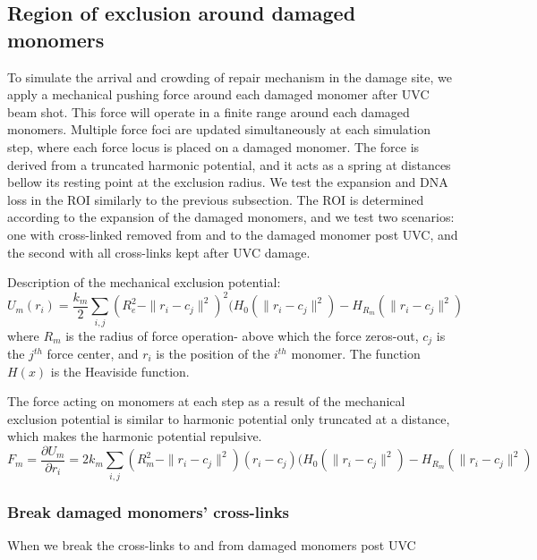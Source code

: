 \documentclass[12pt]{report}
\begin{document}
	 
	 \subsection{Region of exclusion around damaged monomers}
	 To simulate the arrival and crowding of repair mechanism in the damage site, we apply a mechanical pushing force around each damaged monomer after UVC beam shot. This force will operate in a finite range around each damaged monomers. Multiple force foci are updated simultaneously at each simulation step, where each force locus is placed on a damaged monomer. The force is derived from a truncated harmonic potential, and it acts as a spring at distances bellow its resting point at the exclusion radius. We test the expansion and DNA loss in the ROI similarly to the previous subsection. The ROI is determined according to the expansion of the damaged monomers, and we test two scenarios: one with cross-linked removed from and to the damaged monomer post UVC, and the second with all cross-links kept after UVC damage. 
     
     Description of the mechanical exclusion potential:
     \begin{equation*}
     U_m(r_i)= \frac{k_m}{2}\sum_{i,j}(R_e^2-\|r_i-c_j\|^2)^2 (H_0(\|r_i-c_j\|^2)-H_{R_m}(\|r_i-c_j\|^2)
     \end{equation*}
     where $R_m$ is the radius of force operation- above which the force zeros-out, $c_j$ is the $j^{th}$ force center, and $r_i$ is the position of the $i^{th}$ monomer. The function $H(x)$ is the Heaviside function.
     
     The force acting on monomers at each step as a result of the mechanical exclusion potential is similar to harmonic potential only truncated at a distance, which makes the harmonic potential repulsive.
     \begin{equation*}
     F_m=\frac{\partial U_m}{\partial r_i}=2k_m\sum_{i,j}(R_m^2-\|r_i-c_j\|^2)(r_i-c_j)(H_0(\|r_i-c_j\|^2)-H_{R_m}(\|r_i-c_j\|^2)
     \end{equation*}               
     
	 \subsubsection{Break damaged monomers' cross-links}
	 When we break the cross-links to and from damaged monomers post UVC
	 
\end{document}
